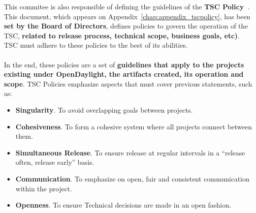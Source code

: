 \documentclass[a4paper, 12pt]{book}
\begin{document}
This commitee is also responsible of defining the guidelines of the \textbf{TSC Policy~\cite{OpenDaylightTSCPolicy}}. This document, which appears on Appendix~\ref{chap:appendix_tscpolicy}, has been \textbf{set by the Board of Directors}, defines policies to govern the operation of the TSC, \textbf{related to release process, technical scope, business goals, etc)}. TSC must adhere to these policies to the best of its abilities.\\
\\
In the end, these policies are a set of \textbf{guidelines that apply to the projects existing under OpenDaylight, the artifacts created, its operation and scope}. TSC Policies emphasize aspects that must cover previous statements, such as:
\begin{itemize}\itemsep0pt
\item{\textbf{Singularity}}. To avoid overlapping goals between projects.
\item{\textbf{Cohesiveness}}. To form a cohesive system where all projects connect between them.
\item{\textbf{Simultaneous Release}}. To ensure release at regular intervals in a ``release often, release early'' basis.
\item{\textbf{Communication}}.  To emphasize on open, fair and consistent communication within the project.
\item{\textbf{Openness}}. To ensure Technical decisions are made in an open fashion.
\end{itemize}
\end{document}
